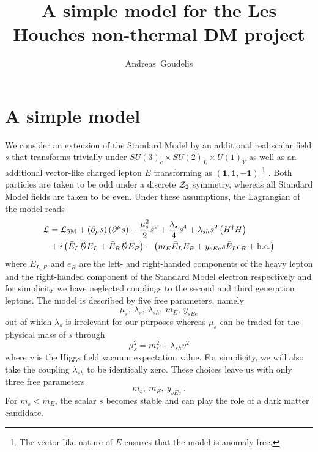 \documentclass[a4paper,11pt]{article}
\title{A simple model for the Les Houches non-thermal DM project}
\author[a]{Andreas~Goudelis}
\affiliation[a]{LPTHE, Sorbonne Universit\'es, UPMC, UMR 7589 - CNRS, F-75252 Paris Cedex, France
}
\begin{document}
\maketitle
\flushbottom
\section{A simple model}\label{sec:modeldescriptions}

We consider an extension of the Standard Model by an additional real scalar field $s$ that transforms trivially under $SU(3)_c \times SU(2)_L \times U(1)_Y$ as well as an additional vector-like charged lepton $E$ transforming as $\left( \mathbf{1}, \mathbf{1}, \mathbf{-1} \right)$
\footnote{The vector-like nature of $E$ ensures that the model is anomaly-free.}
. Both particles are taken to be odd under a discrete ${\cal{Z}}_2$ symmetry, whereas all Standard Model fields are taken to be even. Under these assumptions, the Lagrangian of the model reads
\begin{align}
{\cal{L}} & = {\cal{L}}_{\rm SM} + \left(\partial_\mu s\right)\left(\partial^\mu s\right) - \frac{\mu_s^2}{2} s^2 + \frac{\lambda_s}{4} s^4 + \lambda_{sh} s^2 \left(H^\dagger H\right) \\ \nonumber
& + i \left( \bar{E}_L \slashed{D} E_L  + \bar{E}_R \slashed{D} E_R \right) - \left( m_{E} \bar{E}_L E_R + y_{sEe} s \bar{E}_L e_R + {\rm{h.c.}} \right) 
\end{align}
where $E_{L,R}$ and $e_R$ are the left- and right-handed components of the heavy lepton and the right-handed component of the Standard Model electron respectively and for simplicity we have neglected couplings to the second and third generation leptons. The model is described by five free parameters, namely
\begin{equation}
\mu_s, \ \lambda_s, \ \lambda_{sh}, \ m_E, \ y_{sEe}
\end{equation}
out of which $\lambda_s$ is irrelevant for our purposes whereas $\mu_s$ can be traded for the physical mass of $s$ through
\begin{equation}
\mu_s^2 = m_s^2 + \lambda_{sh} v^2
\end{equation}
where $v$ is the Higgs field vacuum expectation value. For simplicity, we will also take the coupling $\lambda_{sh}$ to be identically zero. These choices leave us with only three free parameters
\begin{equation}
m_s, \ m_E, \ y_{sEe} \ .
\end{equation}
For $m_s < m_E$, the scalar $s$ becomes stable and can play the role of a dark matter candidate. 
\end{document}
